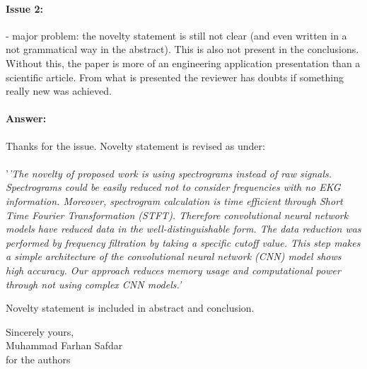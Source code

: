 \documentclass{article}
\begin{document}
\paragraph{Issue 2:}
\begin{displayquote}
- major problem: the novelty statement is still not clear (and even written in a not grammatical way in the abstract). This is also not present in the conclusions. Without this, the paper is more of an engineering application presentation than a scientific article. From what is presented the reviewer has doubts if something really new was achieved.
\end{displayquote}

\paragraph{Answer:}
Thanks for the issue. Novelty statement is revised as under: \\\\


'\textit{'The novelty of proposed work is using spectrograms instead of raw signals. Spectrograms could be easily reduced not to consider frequencies with no EKG information. Moreover, spectrogram calculation is time efficient through Short Time Fourier Transformation (STFT). Therefore convolutional neural network models have reduced data in the well-distinguishable form. The data reduction was performed by frequency filtration by taking a specific cutoff value. This step makes a simple architecture of the convolutional neural network (CNN) model shows high accuracy. Our approach reduces memory usage and computational power through not using complex CNN models.'}

Novelty statement is included in abstract and conclusion.

\vspace{0.5cm}

Sincerely yours,\\
Muhammad Farhan Safdar\\
for the authors
\end{document}

